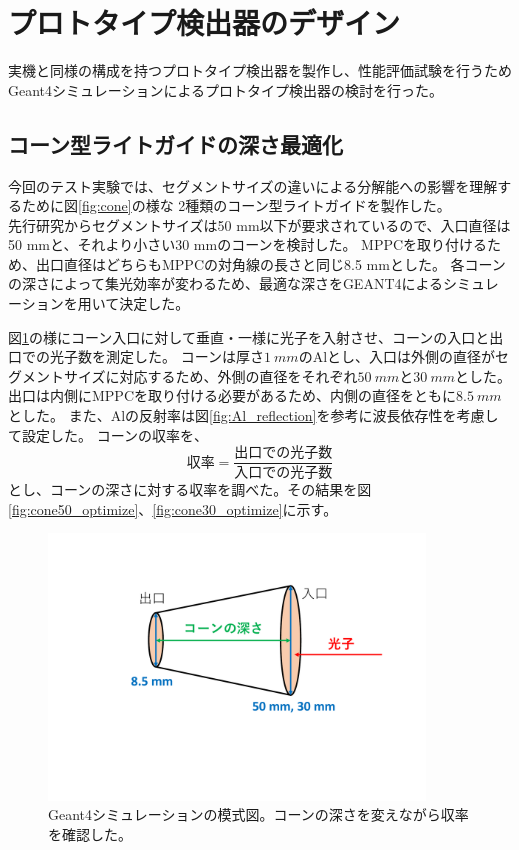 \section{プロトタイプ検出器のデザイン}
実機と同様の構成を持つプロトタイプ検出器を製作し、性能評価試験を行うためGeant4シミュレーションによるプロトタイプ検出器の検討を行った。

\subsection{コーン型ライトガイドの深さ最適化}
今回のテスト実験では、セグメントサイズの違いによる分解能への影響を理解するために図\ref{fig:cone}の様な
2種類のコーン型ライトガイドを製作した。\\
先行研究からセグメントサイズは50 mm以下が要求されているので、入口直径は50 mmと、それより小さい30 mmのコーンを検討した。
MPPCを取り付けるため、出口直径はどちらもMPPCの対角線の長さと同じ8.5 mmとした。
各コーンの深さによって集光効率が変わるため、最適な深さをGEANT4によるシミュレーションを用いて決定した。\\\indent

図\ref{fig:cone_optimize}の様にコーン入口に対して垂直・一様に光子を入射させ、コーンの入口と出口での光子数を測定した。
コーンは厚さ$\SI{1}{mm}$のAlとし、入口は外側の直径がセグメントサイズに対応するため、外側の直径をそれぞれ$\SI{50}{mm}$と$\SI{30}{mm}$とした。
出口は内側にMPPCを取り付ける必要があるため、内側の直径をともに$\SI{8.5}{mm}$とした。
また、Alの反射率は図\ref{fig:Al_reflection}を参考に波長依存性を考慮して設定した。
コーンの収率を、
\begin{equation}
  \label{eq:cone_yield}
  \mbox{収率} = \frac{\mbox{出口での光子数}}{\mbox{入口での光子数}}
\end{equation}
とし、コーンの深さに対する収率を調べた。その結果を図\ref{fig:cone50_optimize}、\ref{fig:cone30_optimize}に示す。
\begin{figure}
  \centering
  \includegraphics[width=10cm]{images/chapter3/cone_optimize.pdf}
  \caption{Geant4シミュレーションの模式図。コーンの深さを変えながら収率を確認した。}
  \label{fig:cone_optimize}
\end{figure}

